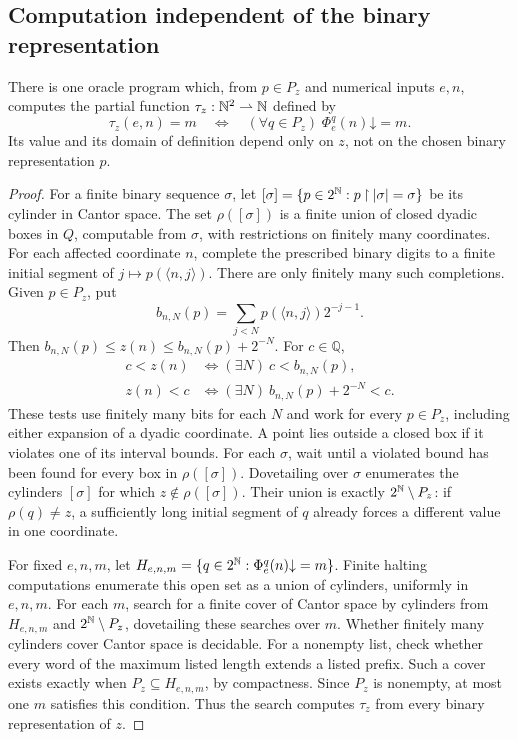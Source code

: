 \subsection{Computation independent of the binary representation}
\label{sec:miller-category}

\begin{lemma}\label{lem:miller-unanimity}
There is one oracle program which, from $p\in P_z$ and numerical inputs
$e,n$, computes the partial function $\tau_z:\mathbb N^2\rightharpoonup\mathbb N$
defined by
\[
 \tau_z(e,n)=m
 \quad\Longleftrightarrow\quad
 (\forall q\in P_z)\;\Phi_e^q(n)\mathord\downarrow=m.
\]
Its value and its domain of definition depend only on $z$, not on the
chosen binary representation $p$.
\end{lemma}
\begin{proof}
For a finite binary sequence $\sigma$, let
$[\sigma]=\{p\in2^{\mathbb N}:p\mathbin{\upharpoonright}|\sigma|=\sigma\}$
be its cylinder in Cantor space.
The set $\rho([\sigma])$ is a finite union of closed dyadic boxes
in $Q$, computable from $\sigma$, with restrictions on finitely
many coordinates. For each affected coordinate $n$, complete the
prescribed binary digits to a finite initial segment of
$j\mapsto p(\langle n,j\rangle)$. There are only finitely many such
completions.
Given $p\in P_z$, put
\[
 b_{n,N}(p)=\sum_{j<N}p(\langle n,j\rangle)2^{-j-1}.
\]
Then $b_{n,N}(p)\le z(n)\le b_{n,N}(p)+2^{-N}$. For $c\in\mathbb Q$,
\[
 \begin{aligned}
 c<z(n)&\iff(\exists N)\ c<b_{n,N}(p),\\
 z(n)<c&\iff(\exists N)\ b_{n,N}(p)+2^{-N}<c .
 \end{aligned}
\]
These tests use finitely many bits for each $N$ and work for every
$p\in P_z$, including either expansion of a dyadic coordinate.
A point lies outside a closed box if it violates one of its interval
bounds. For each $\sigma$, wait until a violated bound has been found
for every box in $\rho([\sigma])$. Dovetailing over $\sigma$ enumerates
the cylinders $[\sigma]$ for which $z\notin\rho([\sigma])$.
Their union is exactly
$2^{\mathbb N}\setminus P_z$: if $\rho(q)\ne z$, a sufficiently long initial
segment of $q$ already forces a different value in one coordinate.

For fixed $e,n,m$, let
$H_{e,n,m}=\{q\in2^{\mathbb N}:\Phi_e^q(n)\mathord\downarrow=m\}$.
Finite halting computations enumerate this open set as a union of
cylinders, uniformly in $e,n,m$. For each $m$, search for a finite cover
of Cantor space by cylinders from $H_{e,n,m}$ and
$2^{\mathbb N}\setminus P_z$, dovetailing these searches over $m$. Whether finitely
many cylinders cover Cantor space is decidable. For a nonempty list,
check whether every word of the maximum listed length extends a listed
prefix. Such a cover exists
exactly when $P_z\subseteq H_{e,n,m}$, by compactness. Since $P_z$ is
nonempty, at most one $m$ satisfies this condition. Thus the search
computes $\tau_z$ from every binary representation of $z$.
\end{proof}

